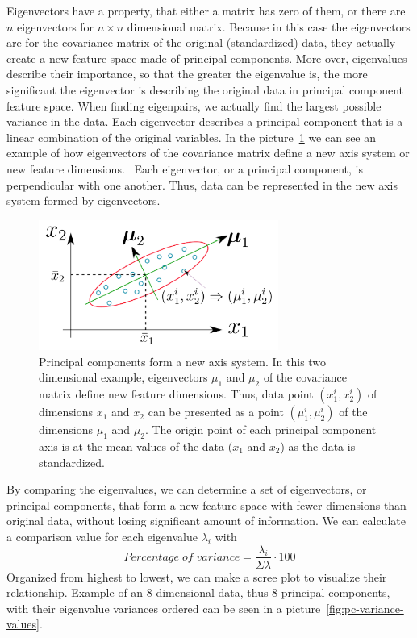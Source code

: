 Eigenvectors have a property,
that either a matrix has zero of them,
or there are $n$ eigenvectors for $n\times n$ dimensional matrix.
Because in this case the eigenvectors are for the covariance matrix of the original (standardized) data,
they actually create a new feature space made of principal components.
More over, %
eigenvalues describe their importance,
so that the greater the eigenvalue is,
the more significant the eigenvector is describing the original data
in principal component feature space.
When finding eigenpairs,
we actually find the largest possible variance in the data.
Each eigenvector describes a principal component
that is a linear combination of the original variables.
In the picture~\ref{fig:pca-example} we can see an example of
how eigenvectors of the covariance matrix define a new axis system
or new feature dimensions.~\cite{zhu2019dimension}
Each eigenvector, or a principal component,
is perpendicular with one another.
Thus, data can be represented
in the new axis system formed by eigenvectors.

\begin{figure}[htb]
    \centering
    \includegraphics[width=0.7\textwidth]{./appendices/pca-example}
    \caption{Principal components form a new axis system.
    In this two dimensional example,
        eigenvectors $\mu_{1}$ and $\mu_{2}$ of the covariance matrix
        define new feature dimensions.
        Thus, data point $(x_{1}^{i},x_{2}^{i})$ of dimensions $x_{1}$ and $x_{2}$
        can be presented as a point $(\mu_{1}^{i},\mu_{2}^{i})$ of the dimensions $\mu_{1}$ and $\mu_{2}$.
        The origin point of each principal component axis is at the mean values of the data ($\bar{x}_{1}$ and $\bar{x}_{2}$)
        as the data is standardized.
        ~\cite{zhu2019dimension}
        \label{fig:pca-example}}
\end{figure}

By comparing the eigenvalues,
we can determine a set of eigenvectors,
or principal components,
that form a new feature space with fewer dimensions than original data,
without losing significant amount of information.
We can calculate a comparison value for each eigenvalue $\lambda_{i}$ with
\begin{equation}
    Percentage\; of\; variance = \frac{\lambda_{i}}{\Sigma\lambda}\cdot100
\end{equation}
Organized from highest to lowest,
we can make a scree plot to visualize their relationship.
Example of an 8 dimensional data,
thus 8 principal components,
with their eigenvalue variances ordered
can be seen in a picture~\ref{fig:pc-variance-values}.

